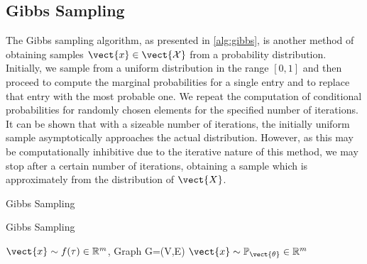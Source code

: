 \subsection{Gibbs Sampling}
The Gibbs sampling algorithm, as presented in \autoref{alg:gibbs}, is another method of obtaining samples $\vect{x} \in \vect{\mathcal{X}}$ from a probability distribution. 
Initially, we sample from a uniform distribution in the range $[0,1]$ and then proceed to compute the marginal probabilities for a single entry and to replace that entry with the most probable one.
We repeat the computation of conditional probabilities for randomly chosen elements for the specified number of iterations. 
It can be shown that with a sizeable number of iterations, the initially uniform sample asymptotically approaches the actual distribution.
However, as this may be computationally inhibitive due to the iterative nature of this method, we may stop after a certain number of iterations, obtaining a sample which is approximately from the distribution of $\vect{X}$.

\begin{algo}{Gibbs Sampling~\cite{yildirim2012bayesian}}
    \begin{algorithm}[H]
        \caption{Gibbs Sampling}
        \begin{algorithmic}[1]
            \label{alg:gibbs}
            \REQUIRE $\vect{x} \sim f(\tau) \in \mathbb{R}^m$, Graph G=(V,E)
            \ENSURE  $\vect{x} \sim \mathbb{P}_{\vect{\theta}}\in \mathbb{R}^m$ \\
                \ENDFOR
            \ENDFOR
        \end{algorithmic}
    \end{algorithm}
\end{algo}
